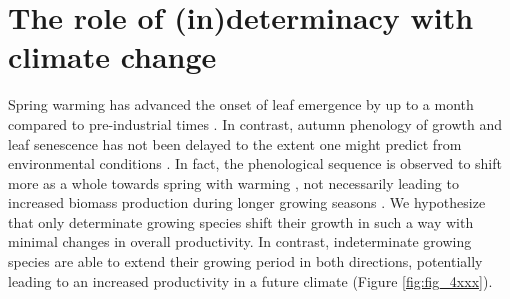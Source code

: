 \documentclass{article}
\begin{document}
	
\section*{The role of (in)determinacy with climate change} %

Spring warming has advanced the onset of leaf emergence by up to a month compared to pre-industrial times \citep{vitasseGreatAccelerationPlant2022b}. In contrast, autumn phenology of growth and leaf senescence has not been delayed to the extent one might predict from environmental conditions \citep{zaniIncreasedGrowingseasonProductivity2020b, zohnerEffectClimateWarming2023}. In fact, the phenological sequence is observed to shift more as a whole towards spring with warming \citep{keenanTimingAutumnSenescence2015b}, not necessarily leading to increased biomass production during longer growing seasons \citep{zaniIncreasedGrowingseasonProductivity2020b}. We hypothesize that only determinate growing species shift their growth in such a way with minimal changes in overall productivity. In contrast, indeterminate growing species are able to extend their growing period in both directions, potentially leading to an increased productivity in a future climate (Figure \ref{fig:fig_4xxx}). \\
\end{document}
